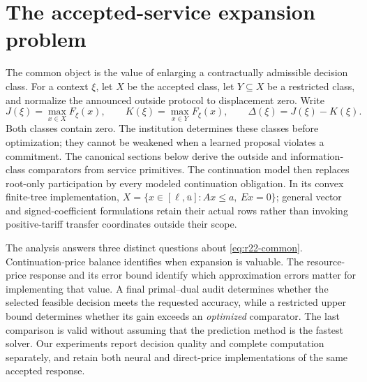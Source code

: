 \section{The accepted-service expansion problem}\label{sec:r22-early}
The common object is the value of enlarging a contractually admissible decision class. For a context $\xi$, let $X$ be the accepted class, let $Y\subseteq X$ be a restricted class, and normalize the announced outside protocol to displacement zero. Write
\begin{equation}\label{eq:r22-common}
 J(\xi)=\max_{x\in X}F_\xi(x),\qquad
 K(\xi)=\max_{x\in Y}F_\xi(x),\qquad
 \Delta(\xi)=J(\xi)-K(\xi).
\end{equation}
Both classes contain zero. The institution determines these classes before optimization; they cannot be weakened when a learned proposal violates a commitment. The canonical sections below derive the outside and information-class comparators from service primitives. The continuation model then replaces root-only participation by every modeled continuation obligation. In its convex finite-tree implementation,
$X=\{x\in[\ell,\bar u]:Ax\leq a,\ Ex=0\}$; general vector and signed-coefficient formulations retain their actual rows rather than invoking positive-tariff transfer coordinates outside their scope.

The analysis answers three distinct questions about \eqref{eq:r22-common}. Continuation-price balance identifies when expansion is valuable. The resource-price response and its error bound identify which approximation errors matter for implementing that value. A final primal--dual audit determines whether the selected feasible decision meets the requested accuracy, while a restricted upper bound determines whether its gain exceeds an \emph{optimized} comparator. The last comparison is valid without assuming that the prediction method is the fastest solver. Our experiments report decision quality and complete computation separately, and retain both neural and direct-price implementations of the same accepted response.
